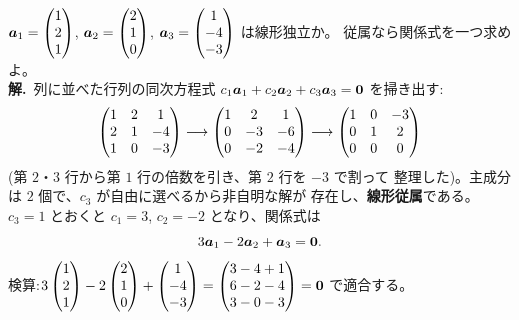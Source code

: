 \begin{rei}[例題・基本($3$ 本の判定と関係式)]\label{rei:rank-judge}
$\bm{a}_1 = \begin{pmatrix}1 \\ 2 \\ 1\end{pmatrix}$, $\bm{a}_2 = \begin{pmatrix}2 \\ 1 \\ 0\end{pmatrix}$,
$\bm{a}_3 = \begin{pmatrix}1 \\ -4 \\ -3\end{pmatrix}$ は線形独立か。
従属なら関係式を一つ求めよ。\\
\textbf{解.}\ 列に並べた行列の同次方程式
$c_1\bm{a}_1 + c_2\bm{a}_2 + c_3\bm{a}_3 = \bm{0}$ を掃き出す:
\[
\begin{pmatrix}1 & 2 & 1 \\ 2 & 1 & -4 \\ 1 & 0 & -3\end{pmatrix}
\longrightarrow
\begin{pmatrix}1 & 2 & 1 \\ 0 & -3 & -6 \\ 0 & -2 & -4\end{pmatrix}
\longrightarrow
\begin{pmatrix}1 & 0 & -3 \\ 0 & 1 & 2 \\ 0 & 0 & 0\end{pmatrix}
\]
(第 $2$・$3$ 行から第 $1$ 行の倍数を引き、第 $2$ 行を $-3$ で割って
整理した)。主成分は $2$ 個で、$c_3$ が自由に選べるから非自明な解が
存在し、\textbf{線形従属}である。$c_3 = 1$ とおくと
$c_1 = 3$, $c_2 = -2$ となり、関係式は
\[
3\bm{a}_1 - 2\bm{a}_2 + \bm{a}_3 = \bm{0}.
\]
検算:$3\begin{pmatrix}1 \\ 2 \\ 1\end{pmatrix} - 2\begin{pmatrix}2 \\ 1 \\ 0\end{pmatrix} + \begin{pmatrix}1 \\ -4 \\ -3\end{pmatrix}
= \begin{pmatrix}3 - 4 + 1 \\ 6 - 2 - 4 \\ 3 - 0 - 3\end{pmatrix} = \bm{0}$ で適合する。
\end{rei}

